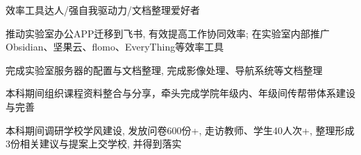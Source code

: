 

\begin{cventries}

\cventry
  {} %
  {效率工具达人/强自我驱动力/文档整理爱好者} %
  {} %
  {} %
  {\begin{cvitems} %
    \item {推动实验室办公APP迁移到飞书, 有效提高工作协同效率; 在实验室内部推广Obsidian、坚果云、flomo、EveryThing等效率工具}
    \item {完成实验室服务器的配置与文档整理, 完成影像处理、导航系统等文档整理}
    \item {本科期间组织课程资料整合与分享，牵头完成学院年级内、年级间传帮带体系建设与完善}
    \item {本科期间调研学校学风建设, 发放问卷600份+, 走访教师、学生40人次+, 整理形成3份相关建议与提案上交学校, 并得到落实}
  \end{cvitems}
  }
\end{cventries}
